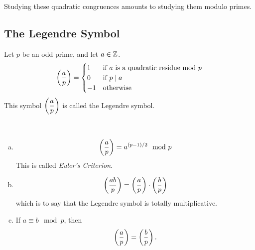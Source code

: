 \begin{remark*}
    Studying these quadratic congruences amounts to studying them modulo primes.
\end{remark*}

\subsection{The Legendre Symbol}
\begin{definition}
    Let $p$ be an odd prime, and let $a\in\mathbb Z$.
    \[\left(\dfrac{a}{p}\right) = \begin{cases}
            1  & \text{if $a$ is a quadratic residue mod $p$} \\
            0  & \text{if $p\mid a$}                          \\
            -1 & \text{otherwise}
        \end{cases}\]
    This symbol $\left(\dfrac{a}{p}\right)$ is called the Legendre symbol.
\end{definition}

\begin{proposition}[5.1.2 of Text]
    ~\begin{enumerate}[(a)]
        \item
              \[\left(\dfrac{a}{p}\right) = a^{(p-1)/2}\mod p\]
              This is called \emph{Euler's Criterion}.
        \item
              \[\left(\dfrac{ab}{p}\right) = \left(\dfrac{a}{p}\right)\cdot\left(\dfrac{b}{p}\right)\]
              which is to say that the Legendre symbol is totally multiplicative.
        \item If $a\equiv b\mod p$, then
              \[\left(\dfrac{a}{p}\right) = \left(\dfrac{b}{p}\right).\]
    \end{enumerate}
\end{proposition}